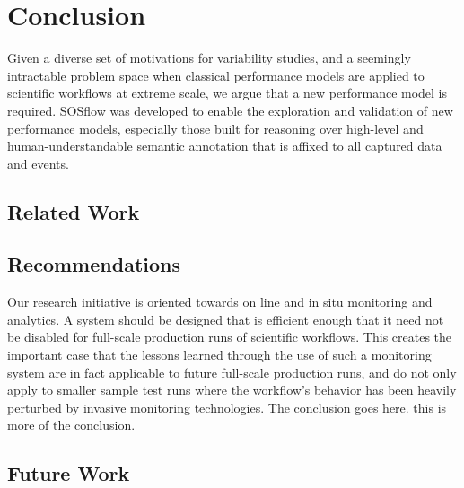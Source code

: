 
\section{Conclusion}
Given a diverse set of motivations for variability studies, and a
seemingly intractable problem space when classical performance models
are applied to scientific workflows at extreme scale, we argue that a
new performance model is required. SOSflow was developed to enable the
exploration and validation of new performance models, especially those
built for reasoning over high-level and human-understandable semantic
annotation that is affixed to all captured data and events.


\subsection{Related Work}




\subsection{Recommendations}
Our research initiative is oriented towards on line and in situ
monitoring and analytics. A system should be designed that is
efficient enough that it need not be disabled for full-scale
production runs of scientific workflows. This creates the important
case that the lessons learned through the use of such a monitoring
system are in fact applicable to future full-scale production runs,
and do not only apply to smaller sample test runs where the workflow's
behavior has been heavily perturbed by invasive monitoring
technologies.    The conclusion goes
here. this is more of the conclusion.


\subsection{Future Work}

